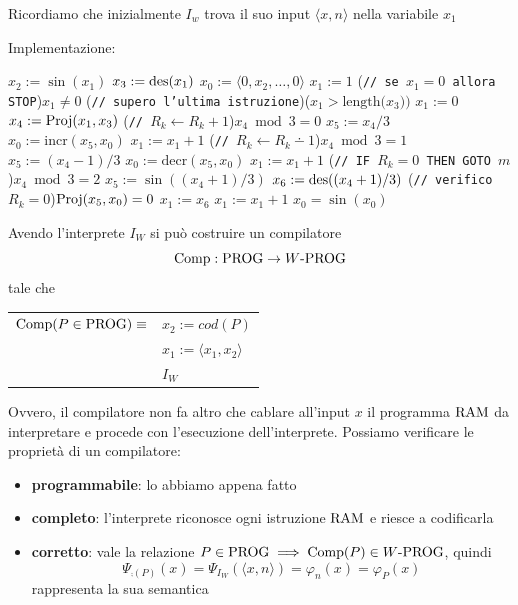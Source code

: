 Ricordiamo che inizialmente $I_{w}$ trova il suo input $\langle x, n \rangle$ nella variabile $x_1$

\newpage

Implementazione:
\begin{tcolorbox}[colback=white,sharp corners,boxrule=.3mm]
	\begin{algorithm}[H]
		\SetAlgoNoEnd
		$x_2 := \sin(x_1)$\;
		$x_3 := \operatorname{des}(x_1)$\;
		$x_0 := \langle 0,x_2,\dots,0 \rangle$\;
		$x_1 := 1$\;
		\While(\hfill\texttt{// se $x_1=0$ allora STOP}){$x_1\neq 0$}{
			\eIf(\hfill\texttt{// supero l'ultima istruzione}){($x_1>\text{length($x_3$))}$}{
				$x_1:=0$
			}{
				$x_4 := \text{Proj}(x_1,x_3)$
				\If(\hfill\texttt{// }$R_k\leftarrow R_k+1$){$x_4\bmod{3}=0$}{
					$x_5 := x_4 / 3$
					$x_0 := \text{incr}(x_5,x_0)$\;
					$x_1 := x_1+1$\;
				}
				\If(\hfill\texttt{// }$R_k\leftarrow R_k\dotminus1$){$x_4\bmod{3}=1$}{
					$x_5 := (x_4-1) / 3$
					$x_0 := \text{decr}(x_5,x_0)$\;
					$x_1 := x_1+1$\;
				}
				\If(\hfill\texttt{// IF $R_k=0$ THEN GOTO $m$}){$x_4\bmod{3}=2$}{
					$x_5 := \sin((x_4+1)/3)$
					$x_6 := \operatorname{des}((x_4+1)/3)$
					\eIf(\hfill\texttt{// verifico }$R_k=0$){$\text{Proj}(x_5,x_0)=0$}{
						$x_1:=x_6$\;
					}{
						$x_1:=x_1+1$\;
					}
				}
			}
		}
		$x_0 = \sin(x_0)$
	\end{algorithm}
\end{tcolorbox}

Avendo l'interprete $I_W$ si può costruire un compilatore
$$ \text{Comp}: \text{PROG} \rightarrow W\text{-PROG} $$
tale che 
\begin{center}
	\begin{tabular}{r|l|}
		\cline{2-2}
		$\text{Comp} (P \in \text{PROG}) \equiv$	& $x_2 := cod(P)$ \\
			& $x_1 := \langle x_1, x_2 \rangle$ \\
			& $I_W$ \\
		\cline{2-2}
	\end{tabular}
\end{center}

Ovvero, il compilatore non fa altro che cablare all'input $x$ il programma $\text{RAM}$ da interpretare e procede con l'esecuzione dell'interprete. Possiamo verificare le proprietà di un compilatore: 
\begin{itemize}
	\item \textbf{programmabile}: lo abbiamo appena fatto
	\item \textbf{completo}: l'interprete riconosce ogni istruzione $\text{RAM}$ e riesce a codificarla
	\item \textbf{corretto}: vale la relazione $P \in \text{PROG} \implies \text{Comp} (P) \in W\text{-PROG}$, quindi
	$$ \Psi_{\comp (P)} (x) = \Psi_{I_W} (\langle x,n \rangle) = \varphi_n (x) = \varphi_P (x) $$
	rappresenta la sua semantica
\end{itemize}

